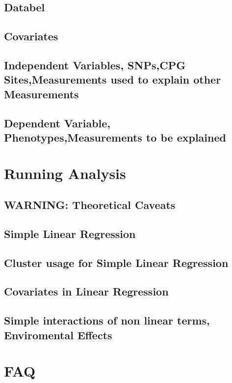 \documentclass{report}
\begin{document}
\section{Databel}
\section{Covariates}
\section{Independent Variables, SNPs,CPG Sites,Measurements used to explain other Measurements}
\section{Dependent Variable, Phenotypes,Measurements to be explained}

\chapter{Running Analysis}

\section{WARNING: Theoretical Caveats}

\section{Simple Linear Regression}

\section{Cluster usage for Simple Linear Regression}

\section{Covariates in Linear Regression}

\section{Simple interactions of non linear terms, Enviromental Effects}


\chapter{FAQ}
\end{document}
